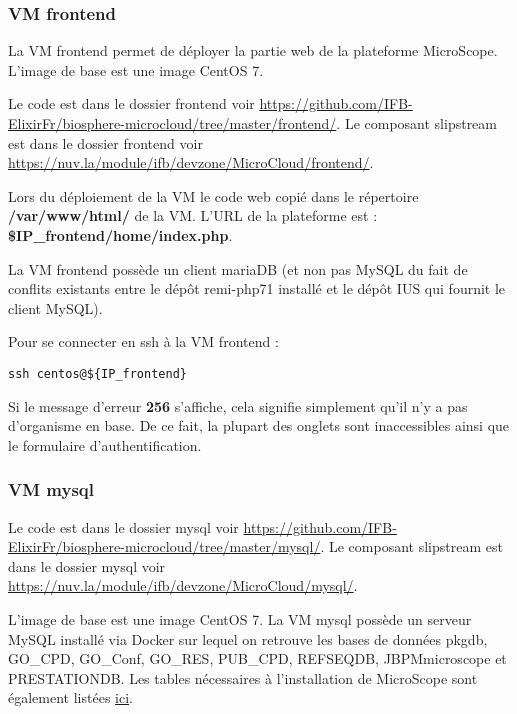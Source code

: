 \subsubsection {VM frontend}\label{frontend}

La VM frontend permet de déployer la partie web de la plateforme MicroScope.
L'image de base est une image CentOS 7.

Le code est dans le dossier frontend voir \url{https://github.com/IFB-ElixirFr/biosphere-microcloud/tree/master/frontend/}.
Le composant slipstream est dans le dossier frontend voir \url{https://nuv.la/module/ifb/devzone/MicroCloud/frontend/}.

Lors du déploiement de la VM le code web copié dans le répertoire \textbf{/var/www/html/} de la VM.
L'URL de la plateforme est : \textbf{\$IP\_frontend/home/index.php}.

La VM frontend possède un client mariaDB (et non pas MySQL du fait de conflits existants entre le dépôt remi-php71 installé et le dépôt IUS qui fournit le client MySQL).\newline

Pour se connecter en ssh à la VM frontend : 
\begin{lstlisting}[style=Bash]
ssh centos@${IP_frontend}
\end{lstlisting}

\begin{mycolorbox}Si le message d’erreur \textbf{256} s’affiche, cela signifie simplement qu’il n’y a pas d’organisme en base. De ce fait, la plupart des onglets sont inaccessibles ainsi que le formulaire d’authentification.
\end{mycolorbox}

\subsubsection {VM mysql}\label{mysql}

Le code est dans le dossier mysql voir \url{https://github.com/IFB-ElixirFr/biosphere-microcloud/tree/master/mysql/}.
Le composant slipstream est dans le dossier mysql voir \url{https://nuv.la/module/ifb/devzone/MicroCloud/mysql/}.

L'image de base est une image CentOS 7.
La VM mysql possède un serveur MySQL installé via Docker sur lequel on retrouve les bases de données pkgdb, GO\_CPD, GO\_Conf, GO\_RES, PUB\_CPD, REFSEQDB, JBPMmicroscope et PRESTATIONDB.
\newline
Les tables nécessaires à l'installation de MicroScope sont également listées \href{https://intranet.genoscope.cns.fr/agc/redmine/projects/microcloud/wiki/Tables_necessaires_a_installation}{ici}.
\newline


